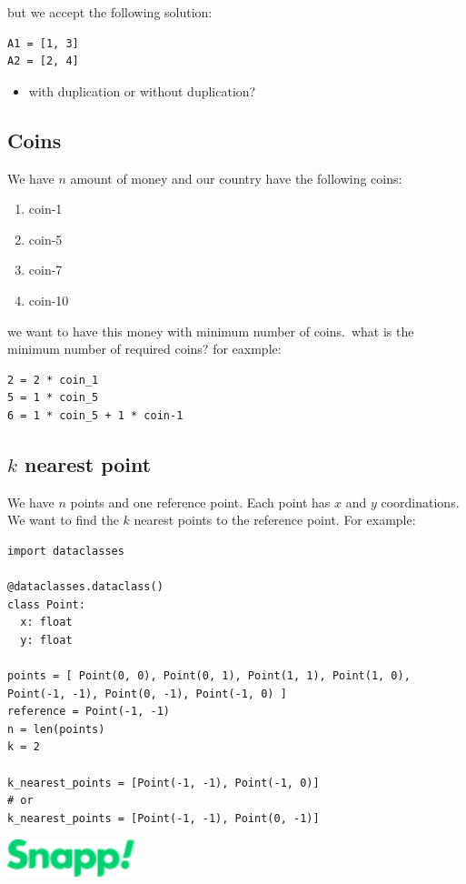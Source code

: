 \documentclass[]{article}
\begin{document}
but we accept the following solution:

\begin{verbatim}
A1 = [1, 3]
A2 = [2, 4]
\end{verbatim}

\begin{itemize}
  \item with duplication or without duplication?
\end{itemize}

\subsection{Coins}

We have $n$ amount of money and our country have the following coins:

\begin{enumerate}
  \item coin-1
  \item coin-5
  \item coin-7
  \item coin-10
\end{enumerate}

we want to have this money with minimum number of coins.\ what is the minimum number of required coins?
for eaxmple:

\begin{verbatim}
2 = 2 * coin_1
5 = 1 * coin_5
6 = 1 * coin_5 + 1 * coin-1
\end{verbatim}

\subsection{$k$ nearest point}

We have $n$ points and one reference point.
Each point has $x$ and $y$ coordinations.
We want to find the $k$ nearest points to the reference point.
For example:

\begin{verbatim}
import dataclasses

@dataclasses.dataclass()
class Point:
  x: float
  y: float

points = [ Point(0, 0), Point(0, 1), Point(1, 1), Point(1, 0), Point(-1, -1), Point(0, -1), Point(-1, 0) ]
reference = Point(-1, -1)
n = len(points)
k = 2

k_nearest_points = [Point(-1, -1), Point(-1, 0)]
# or
k_nearest_points = [Point(-1, -1), Point(0, -1)]
\end{verbatim}


\vspace{\fill}
\includegraphics[width=10em]{./snapp.png}
\end{document}
